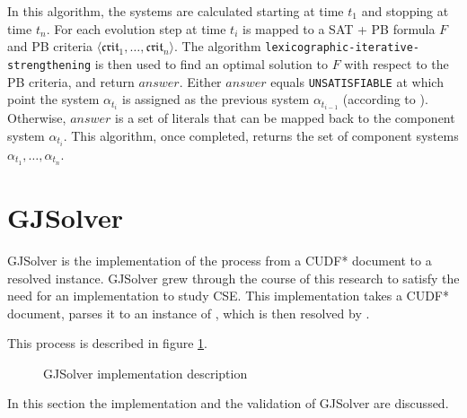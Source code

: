 In this algorithm, the systems are calculated starting at time $t_1$ and stopping at time $t_n$.
For each evolution step at time $t_i$ is mapped to a SAT + PB formula $F$ and PB criteria $\langle \mathfrak{crit}_{1}, \ldots ,\mathfrak{crit}_{n} \rangle$.
The algorithm \texttt{lexicographic-iterative-strengthening} is then used to find an optimal solution to $F$ with respect to the PB criteria, and return $answer$.
Either $answer$ equals \texttt{UNSATISFIABLE} at which point the system $\alpha_{t_i}$ is assigned as the previous system $\alpha_{t_{i-1}}$ (according to ).
Otherwise, $answer$ is a set of literals that can be mapped back to the component system $\alpha_{t_i}$.
This algorithm, once completed, returns the set of component systems $\alpha_{t_1},\ldots,\alpha_{t_n}$.

\section{GJSolver}
\label{impl.gjsolver}
GJSolver is the implementation of the process from a CUDF* document to a resolved \modelname instance.
GJSolver grew through the course of this research to satisfy the need for an implementation to study CSE.
This implementation takes a CUDF* document, parses it to an instance of \modelname, which is then resolved by \modelimpl.

This process is described in figure \ref{impl.modelofgjsolver}.
\begin{figure}[htp]
\begin{center}
  \caption[labelInTOC]{GJSolver implementation description}
  \label{impl.modelofgjsolver}
\end{center}
\end{figure}

In this section the implementation and the validation of GJSolver are discussed.

